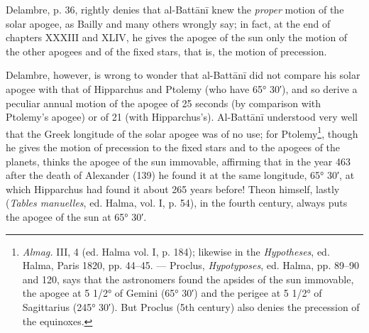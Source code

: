 \documentclass[11pt]{article}
\begin{document}
\par Delambre, p. 36, rightly denies that al-Battānī knew the \emph{proper} motion of the solar apogee, as Bailly and many others wrongly say; in fact, at the end of chapters XXXIII and XLIV, he gives the apogee of the sun only the motion of the other apogees and of the fixed stars, that is, the motion of precession.\par
\par Delambre, however, is wrong to wonder that al-Battānī did not compare his solar apogee with that of Hipparchus and Ptolemy (who have 65° 30′), and so derive a peculiar annual motion of the apogee of 25 seconds (by comparison with Ptolemy's apogee) or of 21 (with Hipparchus's). Al-Battānī understood very well that the Greek longitude of the solar apogee was of no use; for Ptolemy\footnote{\emph{Almag.} III, 4 (ed. Halma vol. I, p. 184); likewise in the \emph{Hypotheses}, ed. Halma, Paris 1820, pp. 44–45. — Proclus, \emph{Hypotyposes}, ed. Halma, pp. 89–90 and 120, says that the astronomers found the apsides of the sun immovable, the apogee at 5 1/2° of Gemini (65° 30′) and the perigee at 5 1/2° of Sagittarius (245° 30′). But Proclus (5th century) also denies the precession of the equinoxes.}, though he gives the motion of precession to the fixed stars and to the apogees of the planets, thinks the apogee of the sun immovable, affirming that in the year 463 after the death of Alexander (139) he found it at the same longitude, 65° 30′, at which Hipparchus had found it about 265 years before! Theon himself, lastly (\emph{Tables manuelles}, ed. Halma, vol. I, p. 54), in the fourth century, always puts the apogee of the sun at 65° 30′.\par
\end{document}
